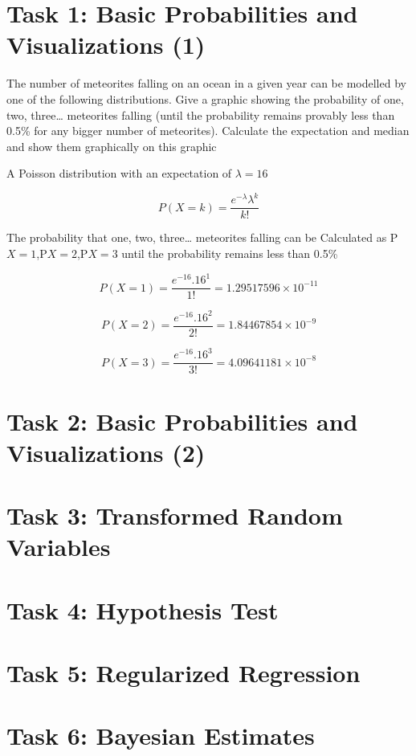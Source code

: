 \chapter{Task 1: Basic Probabilities and Visualizations (1)}
The number of meteorites falling on an ocean in a given year can be modelled by one of the following 
distributions. Give a graphic showing the probability of one, two, three… meteorites falling (until the 
probability remains provably less than 0.5\% for any bigger number of meteorites). Calculate the 
expectation and median and show them graphically on this graphic

A Poisson distribution with an expectation of $ \lambda = 16 $

\begin{equation} P\left( X = k \right) = \frac{{e^{ - \lambda } \lambda ^k }}{{k!}}\end{equation}

The probability that one, two, three… meteorites falling can be Calculated as 
P\(X=1\),P\(X=2\),P\(X=3\) until the probability remains less than 0.5\%


\begin{equation} P\left( X = 1 \right) = \frac{{e^{ -16 }.16 ^1 }}{{1!}} =  1.29517596 \times 10^{-11} \end{equation}

\begin{equation} P\left( X = 2 \right) = \frac{{e^{ -16 }.16 ^2 }}{{2!}} =  1.84467854  \times 10^{-9} \end{equation}

\begin{equation} P\left( X = 3 \right) = \frac{{e^{ -16 }.16 ^3 }}{{3!}} =  4.09641181  \times 10^{-8} \end{equation}











\chapter{Task 2: Basic Probabilities and Visualizations (2)}






\chapter{Task 3: Transformed Random Variables}






\chapter{Task 4: Hypothesis Test}






\chapter{Task 5: Regularized Regression }







\chapter{Task 6: Bayesian Estimates}